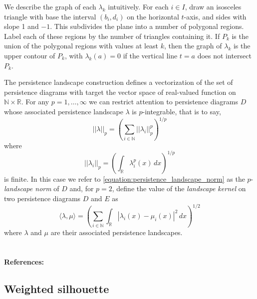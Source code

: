 \documentclass{amsart}
\begin{document}
	We describe the graph of each $\lambda_k$ intuitively. For each $i \in I$, draw an isosceles triangle with base the interval $(b_i, d_i)$ on the horizontal $t$-axis, and sides with slope 1 and $-1$. This subdivides the plane into a number of polygonal regions. Label each of these regions by the number of triangles containing it. If $P_k$ is the union of the polygonal regions with values at least $k$, then the graph of $\lambda_k$ is the upper contour of $P_k$, with $\lambda_k(a) = 0$ if the vertical line $t=a$ does not intersect $P_k$.
	
	The persistence landscape construction defines a
	vectorization of the set of persistence diagrams with target the vector space of real-valued function on $\mathbb N \times \mathbb R$. For any $p = 1,\dots,\infty$ we can restrict attention to persistence diagrams $D$ whose associated persistence landscape $\lambda$ is
	$p$-integrable, that is to say,	
	\begin{equation} \label{equation:persistence_landscape_norm}	
	||\lambda||_p = \left( \sum_{i \in \mathbb N} ||\lambda_i||^p_p \right)^{1/p}	
	\end{equation}	
	where
	\begin{equation*}	
	||\lambda_i||_p = \left( \int_{\mathbb R} \lambda_i^p(x)\, dx \right)^{1/p}	
	\end{equation*}	
	is finite. In this case we refer to \eqref{equation:persistence_landscape_norm} as the $p$-\textit{landscape norm} of $D$ and, for $p = 2$, define the value of the \textit{landscape kernel} on two persistence diagrams $D$ and $E$ as
	\begin{equation*}
	\langle \lambda, \mu \rangle = \left(\sum_{i \in \mathbb N} \int_{\mathbb R} |\lambda_i(x) - \mu_i(x)|^2\, dx\right)^{1/2}
	\end{equation*}
	where $\lambda$ and $\mu$ are their associated persistence landscapes.

	\paragraph{\\ References:} \cite{bubenik2015statistical}
	
	\subsection*{Weighted silhouette} \label{weighted_silhouette}
	
\end{document}
